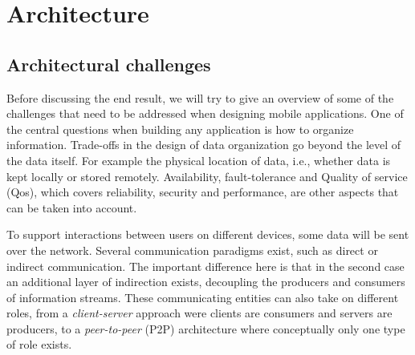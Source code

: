 \chapter{Architecture}\label{chapter:architecture}



%


\section{Architectural challenges}

Before discussing the end result, we will try to give an overview of some of the challenges that need to be addressed when designing mobile applications. One of the central questions when building any application is how to organize information. Trade-offs in the design of data organization go beyond the level of the data itself. For example the physical location of data, i.e., whether data is kept locally or stored remotely. Availability, fault-tolerance and Quality of service (Qos), which covers reliability, security and performance, are other aspects that can be taken into account\cite{}.

To support interactions between users on different devices, some data will be sent over the network. Several communication paradigms exist, such as direct or indirect communication. The important difference here is that in the second case an additional layer of indirection exists, decoupling the producers and consumers of information streams\cite{coulouris:2012}. These communicating entities can also take on different roles, from a \emph{client-server} approach were clients are consumers and servers are producers, to a \emph{peer-to-peer} (P2P) architecture where conceptually only one type of role exists\cite{coulouris:2012}.

